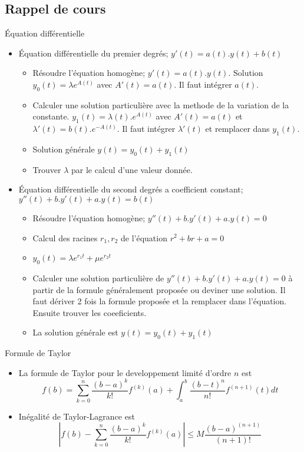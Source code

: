 \documentclass[]{book}
\theoremstyle{definition}
\begin{document}
\subsection*{Rappel de cours}

\'Equation diff\'erentielle

\begin{itemize}
\item \'Equation diff\'erentielle du premier degr\'es; $y'(t) = a(t).y(t) + b(t)$
  \begin{itemize}
  \item R\'esoudre l'\'equation homog\`ene; $y'(t) = a(t).y(t)$. Solution $y_0(t) = \lambda e^{A(t)}$ avec $A'(t) = a(t)$. Il faut int\'egrer $a(t)$.
  \item Calculer une solution particuli\`ere avec la methode de la variation de la constante. $y_1(t) = \lambda(t).e^{A(t)}$ avec $A'(t) = a(t)$ et $\lambda'(t) = b(t).e^{-A(t)}$. Il faut int\'egrer $\lambda'(t)$ et remplacer dans $y_1(t)$.
  \item Solution g\'en\'erale $y(t) = y_0(t) + y_1(t)$
  \item Trouver $\lambda$ par le calcul d'une valeur donn\'ee.
  \end{itemize}
\item \'Equation diff\'erentielle du second degr\'es a coefficient constant; $y''(t) + b.y'(t) + a.y(t) = b(t)$
  \begin{itemize}
  \item R\'esoudre l'\'equation homog\`ene; $y''(t) + b.y'(t) + a.y(t) = 0$
  \item Calcul des racines $r_1, r_2$ de l'\'equation $r^2+br+a = 0$
  \item $y_0(t) = \lambda e^{r_1 t} + \mu e^{r_2 t}$
  \item Calculer une solution particuli\`ere de $y''(t) + b.y'(t) + a.y(t) = 0$ \`a partir de la formule g\'en\'eralement propos\'ee ou deviner une solution. Il faut d\'eriver 2 fois la formule propos\'ee et la remplacer dans l'\'equation. Ensuite trouver les coeeficients.
  \item La solution g\'en\'erale est $y(t) = y_0(t) + y_1(t)$
  \end{itemize} 
\end{itemize}


Formule de Taylor

\begin{itemize}

\item La formule de Taylor pour le developpement limit\'e d'ordre $n$ est
$$f(b) = \sum_{k=0}^n{\frac{(b-a)^k}{k!}f^{(k)}(a)} + \int_a^b{\frac{(b-t)^n}{n!}f^{(n+1)}(t)dt}$$

\item In\'egalit\'e de Taylor-Lagrance est 
$$|f(b) - \sum_{k=0}^n{\frac{(b-a)^k}{k!}f^{(k)}(a)}| \leq M\frac{(b-a)^{(n+1)}}{(n+1)!}$$

\end{itemize}
\end{document}

